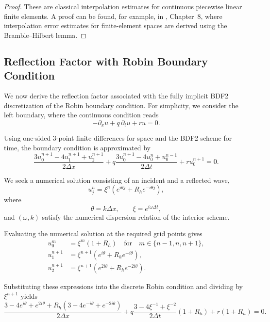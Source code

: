 \documentclass{Configuration_Files/PoliMi3i_thesis}
\begin{document}
\begin{proof}
These are classical interpolation estimates for continuous piecewise linear finite elements. A proof can be found, for example, in \cite{quarteroni_numerical_2007}, Chapter~8, where interpolation error estimates for finite-element spaces are derived using the Bramble--Hilbert lemma.
\end{proof}

\subsection{Reflection Factor with Robin Boundary Condition}
We now derive the reflection factor associated with the fully implicit BDF2 discretization of the Robin boundary condition. For simplicity, we consider the left boundary, where the continuous condition reads
\begin{equation*}
-\partial_xu
+
q\,\partial_tu
+
ru
=
0.
\end{equation*}

Using one-sided 3-point finite differences for space and the BDF2 scheme for time, the boundary condition is approximated by
\begin{equation*}
\frac{3u_{0}^{n+1}-4u_{1}^{n+1}+u_{2}^{n+1}}{2\Delta x}
+
q\frac{3u_0^{n+1}-4u_0^{n}+u_0^{n-1}}{2\Delta t}
+
ru_0^{n+1}
=
0.
\end{equation*}

We seek a numerical solution consisting of an incident and a reflected wave,
\begin{equation*}
u_j^n
=
\xi^n
\left(
e^{i\theta j}
+
R_h e^{-i\theta j}
\right),
\end{equation*}
where
\begin{equation*}
\theta=k\Delta x,
\qquad
\xi=e^{i\omega\Delta t},
\end{equation*}
and $(\omega,k)$ satisfy the numerical dispersion relation of the interior scheme.

Evaluating the numerical solution at the required grid points gives
\begin{align*}
u_0^m &= \xi^m(1+R_h) \quad \text{for} \quad m \in \{n-1, n, n+1\}, \\
u_1^{n+1} &= \xi^{n+1}\left(e^{i\theta} + R_he^{-i\theta}\right), \\
u_2^{n+1} &= \xi^{n+1}\left(e^{2i\theta} + R_he^{-2i\theta}\right).
\end{align*}

Substituting these expressions into the discrete Robin condition and dividing by $\xi^{n+1}$ yields
\begin{equation*}
\frac{3 - 4e^{i\theta} + e^{2i\theta} + R_h\left(3 - 4e^{-i\theta} + e^{-2i\theta}\right)}{2\Delta x}
+
q\frac{3 - 4\xi^{-1} + \xi^{-2}}{2\Delta t}(1+R_h)
+
r(1+R_h)
=
0.
\end{equation*}
\end{document}
